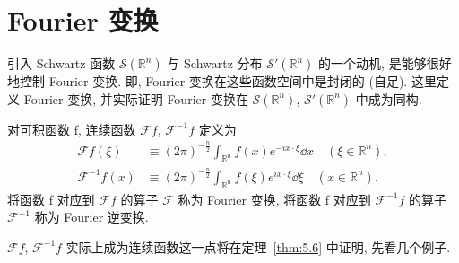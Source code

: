 
\section{Fourier 变换}\label{sec:5.4}



















引入 Schwartz 函数 $\mathcal{S}(\mathbb{R}^{n})$ 与 Schwartz 分布 $\mathcal{S}'(\mathbb{R}^{n})$ 的一个动机, 是能够很好地控制 Fourier 变换. 即, Fourier 变换在这些函数空间中是封闭的 (自足). 这里定义 Fourier 变换, 并实际证明 Fourier 变换在 $\mathcal{S}(\mathbb{R}^{n})$, $\mathcal{S}'(\mathbb{R}^{n})$ 中成为同构.

\begin{definition}\label{def:5.4}
对可积函数 f, 连续函数 $\mathcal{F}f$, $\mathcal{F}^{-1}f$ 定义为
\[
\begin{aligned}
\mathcal{F}f(\xi) &\equiv (2\pi)^{-\frac{n}{2}}\int_{\mathbb{R}^{n}}f(x)e^{-ix \cdot \xi}\dd x \quad (\xi \in \mathbb{R}^{n}), \\
\mathcal{F}^{-1}f(x) &\equiv (2\pi)^{-\frac{n}{2}}\int_{\mathbb{R}^{n}}f(\xi)e^{ix \cdot \xi}\dd \xi \quad (x \in \mathbb{R}^{n}).
\end{aligned}
\]
将函数 f 对应到 $\mathcal{F}f$ 的算子 $\mathcal{F}$ 称为 Fourier 变换, 将函数 f 对应到 $\mathcal{F}^{-1}f$ 的算子 $\mathcal{F}^{-1}$ 称为 Fourier 逆变换.
\end{definition}

$\mathcal{F}f$, $\mathcal{F}^{-1}f$ 实际上成为连续函数这一点将在定理~\ref{thm:5.6} 中证明, 先看几个例子.

